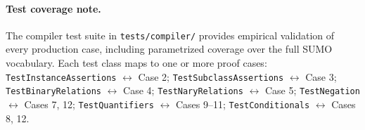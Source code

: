 \paragraph{Test coverage note.}
The compiler test suite in \texttt{tests/compiler/} provides empirical validation
of every production case, including parametrized coverage over the full SUMO
vocabulary. Each test class maps to one or more proof cases:
\texttt{TestInstanceAssertions} $\leftrightarrow$ Case 2;
\texttt{TestSubclassAssertions} $\leftrightarrow$ Case 3;
\texttt{TestBinaryRelations} $\leftrightarrow$ Case 4;
\texttt{TestNaryRelations} $\leftrightarrow$ Case 5;
\texttt{TestNegation} $\leftrightarrow$ Cases 7, 12;
\texttt{TestQuantifiers} $\leftrightarrow$ Cases 9--11;
\texttt{TestConditionals} $\leftrightarrow$ Cases 8, 12.
